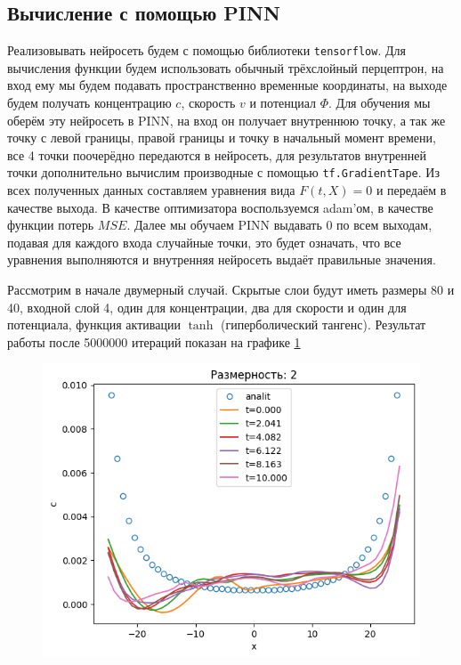 \documentclass[a4paper,12pt]{article} %
\begin{document}
\subsection{Вычисление с помощью PINN}

Реализовывать нейросеть будем с помощью библиотеки \texttt{tensorflow}. Для вычисления функции будем использовать обычный трёхслойный перцептрон, на вход ему мы будем подавать пространственно временные координаты, на выходе будем получать концентрацию $c$, скорость $v$ и потенциал $\Phi$. Для обучения мы оберём эту нейросеть в PINN, на вход он получает внутреннюю точку, а так же точку с левой границы, правой границы и точку в начальный момент времени, все 4 точки поочерёдно передаются в нейросеть, для результатов внутренней точки дополнительно вычислим производные с помощью \texttt{tf.GradientTape}. Из всех полученных данных составляем уравнения вида $F(t, X)=0$ и передаём в качестве выхода. В качестве оптимизатора воспользуемся adam'ом, в качестве функции потерь $MSE$. Далее мы обучаем PINN выдавать 0 по всем выходам, подавая для каждого входа случайные точки, это будет означать, что все уравнения выполняются и внутренняя нейросеть выдаёт правильные значения.

Рассмотрим в начале двумерный случай. Скрытые слои будут иметь размеры 80 и 40, входной слой 4, один для концентрации, два для скорости и один для потенциала, функция активации $\tanh$ (гиперболический тангенс). Результат работы после 5000000 итераций показан на графике \ref{fig:2dres}

\begin{figure}[h]
    \includegraphics[scale=0.5]{../plots/2dim tanh 80 20.png}
    \caption{}
    \label{fig:2dres}
\end{figure}
\end{document}
